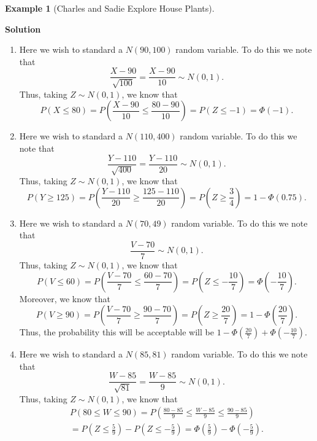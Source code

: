 \documentclass[
  letterpaper,
  DIV=11,
  numbers=noendperiod]{scrreprt}
\providecommand{\tightlist}{%
  \setlength{\itemsep}{0pt}\setlength{\parskip}{0pt}}\usepackage{longtable,booktabs,array}
\theoremstyle{definition}
\theoremstyle{definition}
\newtheorem{example}{Example}[chapter]
\theoremstyle{definition}
\theoremstyle{remark}
\begin{document}
\begin{example}[Charles and Sadie Explore House
Plants]
\begin{tcolorbox}[enhanced jigsaw, colback=white, colframe=quarto-callout-color-frame, arc=.35mm, leftrule=.75mm, rightrule=.15mm, opacityback=0, breakable, bottomrule=.15mm, left=2mm, toprule=.15mm]

\vspace{-3mm}\textbf{Solution}\vspace{3mm}

\begin{enumerate}
\def\labelenumi{\alph{enumi}.}
\tightlist
\item
  Here we wish to standard a \(N(90, 100)\) random variable. To do this
  we note that
  \[\frac{X-90}{\sqrt{100}} = \frac{X - 90}{10} \sim N(0,1).\] Thus,
  taking \(Z \sim N(0,1)\), we know that
  \[P(X \leq 80) = P\left(\frac{X - 90}{10} \leq \frac{80 - 90}{10}\right) = P(Z \leq -1) = \Phi(-1).\]
\item
  Here we wish to standard a \(N(110, 400)\) random variable. To do this
  we note that
  \[\frac{Y-110}{\sqrt{400}} = \frac{Y - 110}{20} \sim N(0,1).\] Thus,
  taking \(Z \sim N(0,1)\), we know that
  \[P(Y \geq 125) = P\left(\frac{Y - 110}{20} \geq \frac{125 - 110}{20}\right) = P(Z \geq \frac{3}{4}) = 1 - \Phi(0.75).\]
\item
  Here we wish to standard a \(N(70, 49)\) random variable. To do this
  we note that \[\frac{V-70}{7} \sim N(0,1).\] Thus, taking
  \(Z \sim N(0,1)\), we know that
  \[P(V \leq 60) = P\left(\frac{V - 70}{7} \leq \frac{60 - 70}{7}\right) = P(Z \leq -\frac{10}{7}) = \Phi(-\frac{10}{7}).\]
  Moreover, we know that
  \[P(V \geq 90) = P\left(\frac{V - 70}{7} \geq \frac{90 - 70}{7}\right) = P(Z \geq \frac{20}{7}) = 1 - \Phi(\frac{20}{7}).\]
  Thus, the probability this will be acceptable will be
  \(1 - \Phi(\frac{20}{7}) + \Phi(-\frac{10}{7})\).
\item
  Here we wish to standard a \(N(85, 81)\) random variable. To do this
  we note that
  \[\frac{W-85}{\sqrt{81}} = \frac{W - 85}{9} \sim N(0,1).\] Thus,
  taking \(Z \sim N(0,1)\), we know that
  \begin{multline*}P(80 \leq W \leq 90) = P\left(\frac{80 - 85}{9} \leq \frac{W - 85}{9} \leq \frac{90 - 85}{9}\right) \\ = P(Z \leq \frac{5}{9}) - P(Z \leq -\frac{5}{9}) = \Phi(\frac{5}{9}) - \Phi(-\frac{5}{9}).\end{multline*}
\end{enumerate}

\end{tcolorbox}

\end{example}
\end{document}
